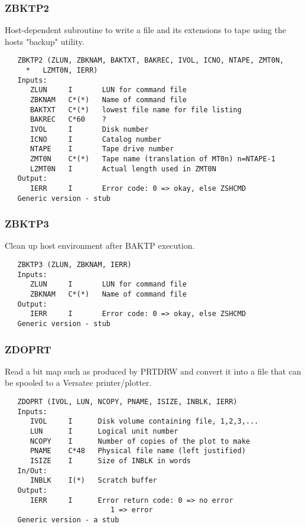 \subsubsection{ZBKTP2}
Host-dependent subroutine to write a file and its extensions to
tape using the hosts "backup" utility.
\begin{verbatim}
   ZBKTP2 (ZLUN, ZBKNAM, BAKTXT, BAKREC, IVOL, ICNO, NTAPE, ZMT0N,
     *   LZMT0N, IERR)
   Inputs:
      ZLUN     I       LUN for command file
      ZBKNAM   C*(*)   Name of command file
      BAKTXT   C*(*)   lowest file name for file listing
      BAKREC   C*60    ?
      IVOL     I       Disk number
      ICNO     I       Catalog number
      NTAPE    I       Tape drive number
      ZMT0N    C*(*)   Tape name (translation of MT0n) n=NTAPE-1
      LZMT0N   I       Actual length used in ZMT0N
   Output:
      IERR     I       Error code: 0 => okay, else ZSHCMD
   Generic version - stub
\end{verbatim}

\subsubsection{ZBKTP3}
Clean up host environment after BAKTP execution.
\begin{verbatim}
   ZBKTP3 (ZLUN, ZBKNAM, IERR)
   Inputs:
      ZLUN     I       LUN for command file
      ZBKNAM   C*(*)   Name of command file
   Output:
      IERR     I       Error code: 0 => okay, else ZSHCMD
   Generic version - stub
\end{verbatim}

\subsubsection{ZDOPRT}
Read a bit map such as produced by PRTDRW and convert it into a
file that can be spooled to a Versatec printer/plotter.
\begin{verbatim}
   ZDOPRT (IVOL, LUN, NCOPY, PNAME, ISIZE, INBLK, IERR)
   Inputs:
      IVOL     I      Disk volume containing file, 1,2,3,...
      LUN      I      Logical unit number
      NCOPY    I      Number of copies of the plot to make
      PNAME    C*48   Physical file name (left justified)
      ISIZE    I      Size of INBLK in words
   In/Out:
      INBLK    I(*)   Scratch buffer
   Output:
      IERR     I      Error return code: 0 => no error
                         1 => error
   Generic version - a stub
\end{verbatim}


